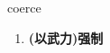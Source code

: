 
\begin{frame}
{\huge coerce}
\begin{center}
\begin{enumerate}\Large
  \item \textbf{(以武力)强制}
\end{enumerate}
\end{center}
\end{frame}

